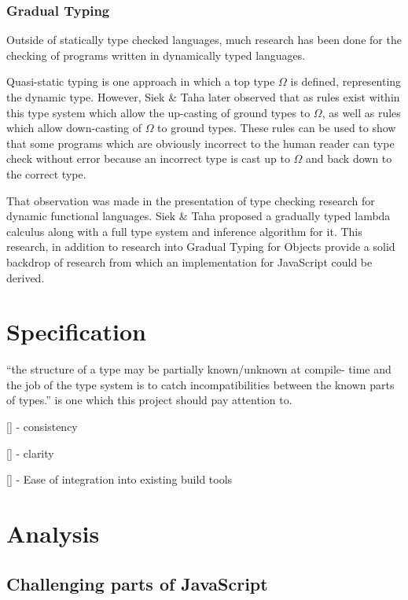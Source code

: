 \documentclass[british, twoside]{bhamthesis}
\theoremstyle{definition}
\begin{document}
    \subsection{Gradual Typing}
      Outside of statically type checked languages, much research has been done for the checking of programs written in dynamically typed languages.

      Quasi-static typing\autocite{Thatte1989} is one approach in which a top type $\Omega$ is defined, representing the dynamic type. However, Siek \& Taha later observed that as rules exist within this type system which allow the up-casting of ground types to $\Omega$, as well as rules which allow down-casting of $\Omega$ to ground types. These rules can be used to show that some programs which are obviously incorrect to the human reader can type check without error because an incorrect type is cast up to $\Omega$ and back down to the correct type\autocite{Siek2006}.

      That observation was made in the presentation of type checking research for dynamic functional languages. Siek \& Taha proposed a gradually typed lambda calculus along with a full type system and inference algorithm for it\autocite{Siek2006}. This research, in addition to research into Gradual Typing for Objects\autocite{Siek2007} provide a solid backdrop of research from which an implementation for JavaScript could be derived.


\chapter{Specification}

  ``the structure of a type may be partially known/unknown at compile- time and the job of the type system is to catch incompatibilities between the known parts of types.''\autocite{Siek2006} is one which this project should pay attention to.

  [] - consistency

  [] - clarity

  [] - Ease of integration into existing build tools

\chapter{Analysis}

  \section{Challenging parts of JavaScript}
\end{document}

